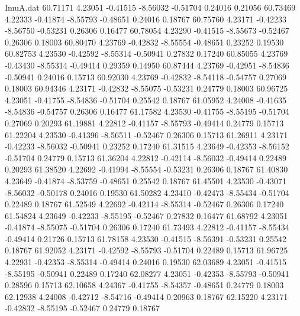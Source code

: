 \begin{filecontents}{ImuA.dat}
  60.71171    4.23051   -0.41515   -8.56032   -0.51704    0.24016    0.21056
  60.73469    4.22333   -0.41874   -8.55793   -0.48651    0.24016    0.18767
  60.75760    4.23171   -0.42233   -8.56750   -0.53231    0.26306    0.16477
  60.78054    4.23290   -0.41515   -8.55673   -0.52467    0.26306    0.18003
  60.80470    4.23769   -0.42832   -8.55554   -0.48651    0.23252    0.19530
  60.82753    4.23530   -0.42592   -8.55314   -0.50941    0.27832    0.17240
  60.85055    4.23769   -0.43430   -8.55314   -0.49414    0.29359    0.14950
  60.87444    4.23769   -0.42951   -8.54836   -0.50941    0.24016    0.15713
  60.92030    4.23769   -0.42832   -8.54118   -0.54757    0.27069    0.18003
  60.94346    4.23171   -0.42832   -8.55075   -0.53231    0.24779    0.18003
  60.96725    4.23051   -0.41755   -8.54836   -0.51704    0.25542    0.18767
  61.05952    4.24008   -0.41635   -8.54836   -0.54757    0.26306    0.16477
  61.17582    4.23530   -0.41755   -8.55195   -0.51704    0.27069    0.20293
  61.19881    4.22812   -0.41157   -8.55793   -0.49414    0.24779    0.15713
  61.22204    4.23530   -0.41396   -8.56511   -0.52467    0.26306    0.15713
  61.26911    4.23171   -0.42233   -8.56032   -0.50941    0.23252    0.17240
  61.31515    4.23649   -0.42353   -8.56152   -0.51704    0.24779    0.15713
  61.36204    4.22812   -0.42114   -8.56032   -0.49414    0.22489    0.20293
  61.38520    4.22692   -0.41994   -8.55554   -0.53231    0.26306    0.18767
  61.40830    4.23649   -0.41874   -8.53759   -0.48651    0.25542    0.18767
  61.45501    4.23530   -0.43071   -8.56032   -0.50178    0.24016    0.19530
  61.50282    4.23410   -0.42473   -8.55434   -0.51704    0.22489    0.18767
  61.52549    4.22692   -0.42114   -8.55314   -0.52467    0.26306    0.17240
  61.54824    4.23649   -0.42233   -8.55195   -0.52467    0.27832    0.16477
  61.68792    4.23051   -0.41874   -8.55075   -0.51704    0.26306    0.17240
  61.73493    4.22812   -0.41157   -8.55434   -0.49414    0.21726    0.15713
  61.78158    4.23530   -0.41515   -8.56391   -0.53231    0.25542    0.18767
  61.92052    4.23171   -0.42592   -8.55793   -0.51704    0.22489    0.15713
  61.96725    4.22931   -0.42353   -8.55314   -0.49414    0.24016    0.19530
  62.03689    4.23051   -0.41515   -8.55195   -0.50941    0.22489    0.17240
  62.08277    4.23051   -0.42353   -8.55793   -0.50941    0.28596    0.15713
  62.10658    4.24367   -0.41755   -8.54357   -0.48651    0.24779    0.18003
  62.12938    4.24008   -0.42712   -8.54716   -0.49414    0.20963    0.18767
  62.15220    4.23171   -0.42832   -8.55195   -0.52467    0.24779    0.18767

\end{filecontents}
